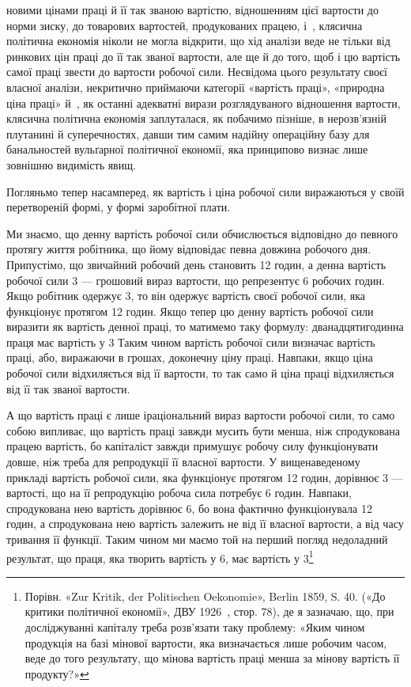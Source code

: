 \parcont{}  %
новими цінами праці й її так званою вартістю, відношенням цієї
вартости до норми зиску, до товарових вартостей, продукованих
працею, і~, клясична політична економія ніколи не могла
відкрити, що хід аналізи веде не тільки від ринкових цін праці
до її так званої вартости, але ще й до того, щоб і цю вартість
самої праці звести до вартости робочої сили. Несвідома цього
результату своєї власної аналізи, некритично приймаючи категорії
«вартість праці», «природна ціна праці» й~, як останні
адекватні вирази розглядуваного відношення вартости, клясична
політична економія заплуталася, як побачимо пізніше, в нерозв’язній
плутанині й суперечностях, давши тим самим надійну
операційну базу для банальностей вульґарної політичної економії,
яка принципово визнає лише зовнішню видимість явищ.

Погляньмо тепер насамперед, як вартість і ціна робочої сили
виражаються у своїй перетвореній формі, у формі заробітної
плати.

Ми знаємо, що денну вартість робочої сили обчислюється
відповідно до певного протягу життя робітника, що йому відповідає
певна довжина робочого дня. Припустімо, що звичайний
робочий день становить 12 годин, а денна вартість робочої сили
3 — грошовий вираз вартости, що репрезентує 6 робочих
годин. Якщо робітник одержує 3, то він одержує вартість
своєї робочої сили, яка функціонує протягом 12 годин.
Якщо тепер цю денну вартість робочої сили виразити як вартість
денної праці, то матимемо таку формулу: дванадцятигодинна
праця має вартість у 3 Таким чином вартість
робочої сили визначає вартість праці, або, виражаючи в грошах,
доконечну ціну праці. Навпаки, якщо ціна робочої сили
відхиляється від її вартости, то так само й ціна праці відхиляється
від її так званої вартости.

А що вартість праці є лише іраціональний вираз вартости
робочої сили, то само собою випливає, що вартість праці завжди
мусить бути менша, ніж спродукована працею вартість, бо капіталіст
завжди примушує робочу силу функціонувати довше,
ніж треба для репродукції її власної вартости. У вищенаведеному
прикладі вартість робочої сили, яка функціонує протягом
12 годин, дорівнює 3 — вартості, що на її репродукцію
робоча сила потребує 6 годин. Навпаки, спродукована
нею вартість дорівнює 6, бо вона фактично функціонувала
12 годин, а спродукована нею вартість залежить не від її
власної вартости, а від часу тривання її функції. Таким чином
ми маємо той на перший погляд недоладний результат, що праця,
яка творить вартість у 6, має вартість у 3\footnote{
Порівн. «Zur Kritik, der Politischen Oekonomie», Berlin 1859,
S. 40. («До критики політичної економії», ДВУ 1926~, стор. 78), де я
зазначаю, що, при досліджуванні капіталу треба розв’язати таку проблему:
«Яким чином продукція на базі мінової вартости, яка визначається
лише робочим часом, веде до того результату, що мінова вартість
праці менша за мінову вартість її продукту?»
}
